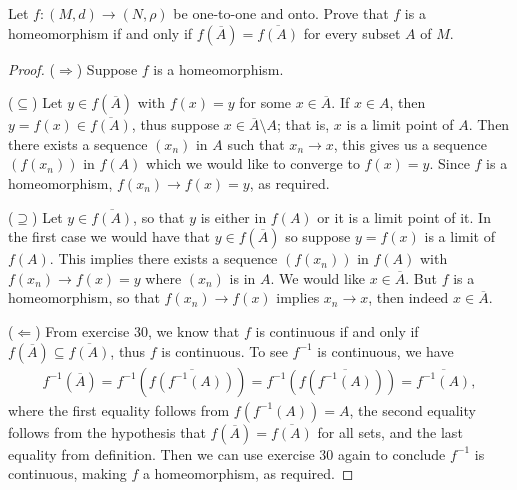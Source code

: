 \begin{exercise}{58}
Let $f:(M,d)\to(N,\rho)$ be one-to-one and onto.
Prove that $f$ is a homeomorphism if and only if $f(\overline{A})=\overline{f(A)}$ for every subset $A$ of $M$.
\end{exercise}
\begin{proof}
($\Rightarrow$)
Suppose $f$ is a homeomorphism.

($\subseteq$)
Let $y\in f(\overline{A})$ with $f(x)=y$ for some $x\in\overline{A}$.
If $x\in A$, then $y=f(x)\in \overline{f(A)}$, thus suppose $x\in \overline{A}\setminus A$;
that is, $x$ is a limit point of $A$.
Then there exists a sequence $(x_n)$ in $A$ such that $x_n\to x$, this gives us a sequence $(f(x_n))$ in $f(A)$ which we would like to converge to $f(x)=y$.
Since $f$ is a homeomorphism, $f(x_n)\to f(x)=y$, as required.

($\supseteq$)
Let $y\in\overline{f(A)}$, so that $y$ is either in $f(A)$ or it is a limit point of it. 
In the first case we would have that $y\in f(\overline{A})$ so suppose $y=f(x)$ is a limit of $f(A)$.
This implies there exists a sequence $(f(x_n))$ in $f(A)$ with $f(x_n)\to f(x)=y$ where $(x_n)$ is in $A$.
We would like $x\in\overline{A}$.
But $f$ is a homeomorphism, so that $f(x_n)\to f(x)$ implies $x_n\to x$, then indeed $x\in\overline{A}$.

($\Leftarrow$)
From exercise 30, we know that $f$ is continuous if and only if $f(\overline{A})\subseteq \overline{f(A)}$, thus $f$ is continuous.
To see $f^{-1}$ is continuous, we have
\begin{align*}
    f^{-1}(\overline{A}) 
    = f^{-1}(\overline{f(f^{-1}(A))}) 
    = f^{-1}(f(\overline{f^{-1}(A)})) 
    = \overline{f^{-1}(A)},
\end{align*}
where the first equality follows from $f(f^{-1}(A))=A$, the second equality follows from the hypothesis that $f(\overline{A})=\overline{f(A)}$ for all sets, and the last equality from definition.
Then we can use exercise 30 again to conclude $f^{-1}$ is continuous, making $f$ a homeomorphism, as required.
\end{proof} 


